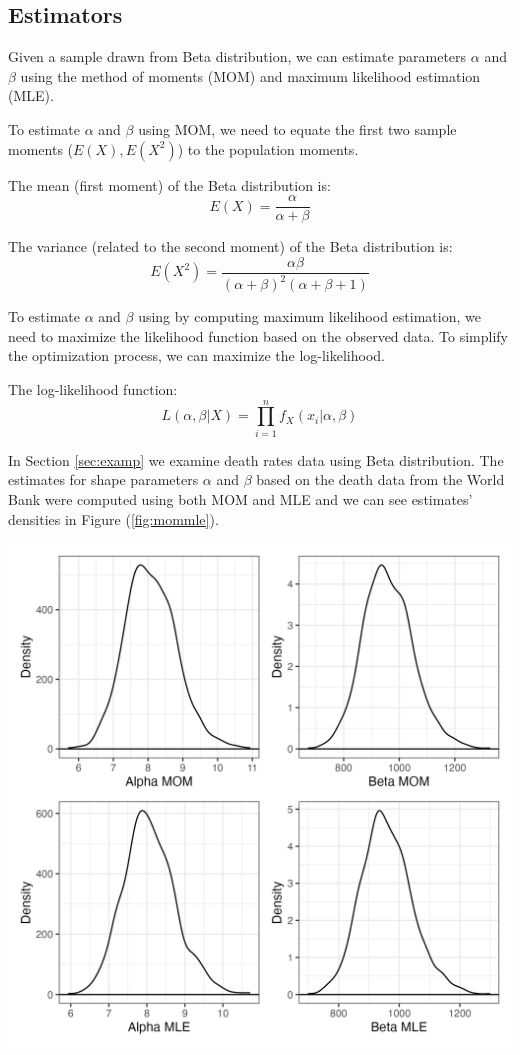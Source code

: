 \documentclass{article}\usepackage[]{graphicx}\usepackage[]{xcolor}
\newenvironment{Figure}
  {\par\medskip\noindent\minipage{\linewidth}}
  {\endminipage\par\medskip}
\begin{document}
\begin{multicols}{2}
\section{Estimators}\label{sec:estim}

Given a sample drawn from Beta distribution, we can estimate parameters $\alpha$ and $\beta$ using the method of moments (MOM) and maximum likelihood estimation (MLE).

To estimate $\alpha$ and $\beta$ using MOM, we need to equate the first two sample moments ($E(X), E(X^2)$) to the population moments.

The mean (first moment) of the Beta distribution is:
$$E(X) = \frac{\alpha}{\alpha + \beta}$$

The variance (related to the second moment) of the Beta distribution is:
$$E(X^2) = \frac{\alpha \beta}{(\alpha + \beta)^2 (\alpha + \beta + 1)}$$

To estimate $\alpha$ and $\beta$ using by computing maximum likelihood estimation, we need to maximize the likelihood function based on the observed data. To simplify the optimization process, we can maximize the log-likelihood.

The log-likelihood function:
$$L(\alpha, \beta | X) = \prod_{i=1}^{n} f_X(x_i| \alpha, \beta)$$

In Section \ref{sec:examp} we examine death rates data using Beta distribution. The estimates for shape parameters $\alpha$ and $\beta$ based on the death data from the World Bank were computed using both MOM and MLE and we can see estimates' densities in Figure (\ref{fig:mommle}).

\begin{Figure}
 \centering
 \includegraphics[width=\linewidth]{mommle.png}
 \label{fig:mommle}
\end{Figure}



\end{multicols}
\end{document}
